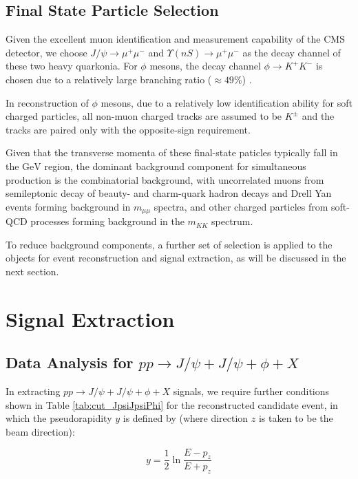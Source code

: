 \documentclass[10pt,twocolumn]{article}
\begin{document}
\subsection{Final State Particle Selection}

Given the excellent muon identification and measurement capability of the CMS detector,  we choose $J/\psi\to\mu^+\mu^-$ and $\Upsilon(nS)\to\mu^+\mu^-$ as the decay channel of these two heavy quarkonia. For $\phi$ mesons, the decay channel $\phi\to K^+K^-$ is chosen due to a relatively large branching ratio ($\approx 49\%$) \cite{PDG2020}.

In reconstruction of $\phi$ mesons, due to a relatively low identification ability for soft charged particles, all non-muon charged tracks are assumed to be $K^\pm $ and the tracks are paired only with the opposite-sign requirement.

Given that the transverse momenta of these final-state paticles typically fall in the $\text{GeV}$ region, the dominant background component for simultaneous production is the combinatorial background, with uncorrelated muons from semileptonic decay of beauty- and charm-quark hadron decays and Drell Yan events forming background in $m_{\mu\mu}$ spectra, and other charged particles from soft-QCD processes forming background in the $m_{KK}$ spectrum\cite{CMS_TRI_JPSI}.

To reduce background components, a further set of selection is applied to the objects for event reconstruction and signal extraction, as will be discussed in the next section.

\section{Signal Extraction}

\subsection{Data Analysis for \texorpdfstring{$pp\to J/\psi+J/\psi+\phi+X$}{pp -> J/psi + J/psi + phi}}

In extracting $pp\to J/\psi+J/\psi+\phi+X$ signals, we require further conditions shown in Table \ref{tab:cut_JpsiJpsiPhi} for the reconstructed candidate event, in which the pseudorapidity $y$ is defined by (where direction $z$ is taken to be the beam direction):

\begin{equation}
    y = \frac{1}{2} \ln \frac {E-p_z}{E+p_z}
\end{equation}
\end{document}
